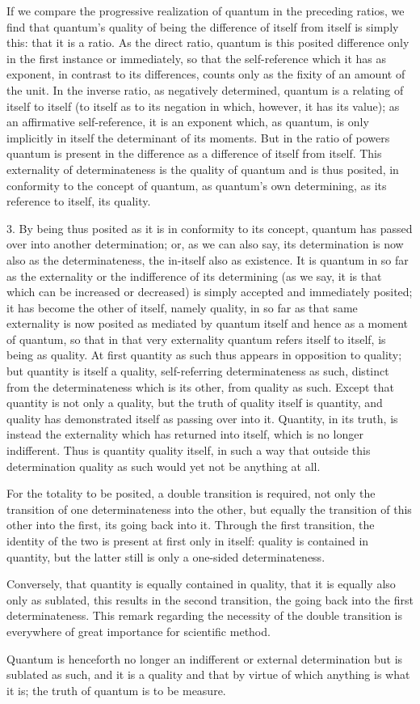 If we compare the progressive realization
of quantum in the preceding ratios,
we find that quantum's quality of being
the difference of itself from itself is simply this:
that it is a ratio.
As the direct ratio, quantum is this posited difference
only in the first instance or immediately,
so that the self-reference which it has as exponent,
in contrast to its differences,
counts only as the fixity of an amount of the unit.
In the inverse ratio, as negatively determined,
quantum is a relating of itself to itself
(to itself as to its negation
in which, however, it has its value);
as an affirmative self-reference,
it is an exponent which, as quantum,
is only implicitly in itself the determinant of its moments.
But in the ratio of powers quantum is present
in the difference as a difference of itself from itself.
This externality of determinateness is
the quality of quantum and is thus posited,
in conformity to the concept of quantum,
as quantum's own determining,
as its reference to itself, its quality.

3. By being thus posited as it is in conformity to its concept,
quantum has passed over into another determination;
or, as we can also say, its determination is
now also as the determinateness,
the in-itself also as existence.
It is quantum in so far as the externality
or the indifference of its determining
(as we say, it is that which can be increased or decreased)
is simply accepted and immediately posited;
it has become the other of itself, namely quality,
in so far as that same externality is now posited
as mediated by quantum itself
and hence as a moment of quantum,
so that in that very externality
quantum refers itself to itself,
is being as quality.
At first quantity as such thus appears
in opposition to quality;
but quantity is itself a quality,
self-referring determinateness as such,
distinct from the determinateness which is its other,
from quality as such.
Except that quantity is not only a quality,
but the truth of quality itself is quantity,
and quality has demonstrated itself as passing over into it.
Quantity, in its truth, is instead the externality
which has returned into itself,
which is no longer indifferent.
Thus is quantity quality itself,
in such a way that outside this determination
quality as such would yet not be anything at all.

For the totality to be posited,
a double transition is required,
not only the transition of
one determinateness into the other,
but equally the transition of
this other into the first,
its going back into it.
Through the first transition,
the identity of the two is present at first only in itself:
quality is contained in quantity,
but the latter still is only a one-sided determinateness.

Conversely, that quantity is equally contained in quality,
that it is equally also only as sublated,
this results in the second transition,
the going back into the first determinateness.
This remark regarding the necessity of the double transition
is everywhere of great importance for scientific method.

Quantum is henceforth no longer an indifferent
or external determination but is sublated as such,
and it is a quality and that by virtue of which
anything is what it is;
the truth of quantum is to be measure.
